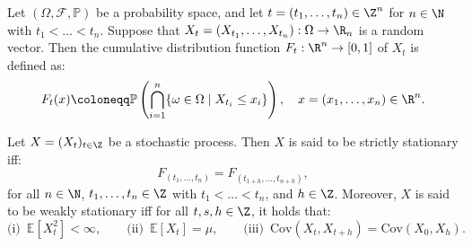 \begin{defn}
Let $(\Omega,\mathcal{F},\mathbb{P})$ be a probability space, and let $t=(t_{1},\dots,t_{n})\in\Z^{n}$ for $n\in\N$ with $t_{1}<\dots<t_{n}$. Suppose that $X_{t}=(X_{t_{1}},\dots,X_{t_{n}}):\Omega\to\R_{n}$ is a random vector. Then the cumulative distribution function $F_{t}:\R^{n}\to[0,1]$ of $X_{t}$ is defined as:
\begin{equation}
    F_{t}(x)\coloneqq\mathbb{P}\left(\bigcap\limits_{i=1}^{n}\{\omega\in\Omega\mid X_{t_{i}}\leq x_{i}\}\right),\quad x=(x_{1},\dots,x_{n})\in\R^{n}.
\end{equation}
\end{defn}
\begin{defn}
Let $X=(X_{t})_{t\in\Z}$ be a stochastic process. Then $X$ is said to be strictly stationary iff: %
\begin{equation}
    F_{(t_{1},\dots,t_{n})}=F_{(t_{1+h},\dots,t_{n+h})},
\end{equation}
for all $n\in\N$, $t_{1},\dots,t_{n}\in\Z$ with $t_{1}<\dots<t_{n}$, and $h\in\Z$. Moreover, $X$ is said to be weakly stationary iff for all $t,s,h\in\Z$, it holds that:
\begin{equation*}
    \textrm{(i)}\hspace{6pt}\mathbb{E}[X_{t}^{2}]<\infty,\qquad\textrm{(ii)}\hspace{6pt}\mathbb{E}[X_{t}]=\mu,\qquad\textrm{(iii)}\hspace{6pt}\mathrm{Cov}(X_{t},X_{t+h})=\mathrm{Cov}(X_{0},X_{h}).
\end{equation*}
\end{defn}

